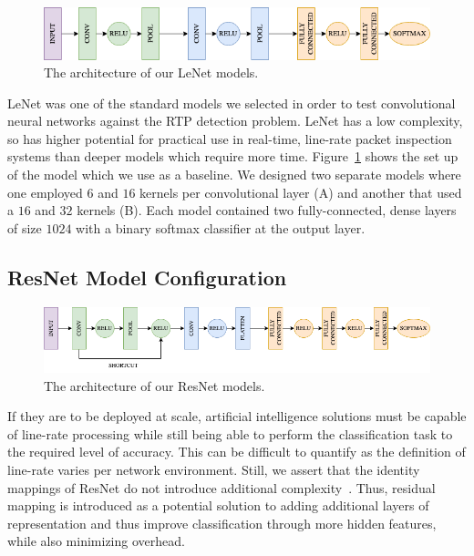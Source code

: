 \begin{figure} [ht!]
\includegraphics[width=\linewidth]{chapters/5/img/lenet.drawio.png}
\caption{The architecture of our LeNet models.}
\label{fig:lenet}
\end{figure}

LeNet was one of the standard models we selected in order to test convolutional neural networks against the RTP detection problem. LeNet has a low complexity, so has higher potential for practical use in real-time, line-rate packet inspection systems than deeper models which require more time. Figure~\ref{fig:lenet} shows the set up of the model which we use as a baseline. We designed two separate models where one employed $6$ and $16$ kernels per convolutional layer (A) and another that used a $16$ and $32$ kernels (B). Each model contained two fully-connected, dense layers of size $1024$ with a binary softmax classifier at the output layer.

\subsection{ResNet Model Configuration}

\begin{figure} [ht!]
\includegraphics[width=\linewidth]{chapters/5/img/resnet.drawio.png}
\caption{The architecture of our ResNet models.}
\label{fig:resnet}
\end{figure}

If they are to be deployed at scale, artificial intelligence solutions must be capable of line-rate processing while still being able to perform the classification task to the required level of accuracy. This can be difficult to quantify as the definition of line-rate varies per network environment. Still, we assert that the identity mappings of ResNet do not introduce additional complexity~\cite{resnet}. Thus, residual mapping is introduced as a potential solution to adding additional layers of representation and thus improve classification through more hidden features, while also minimizing overhead.

